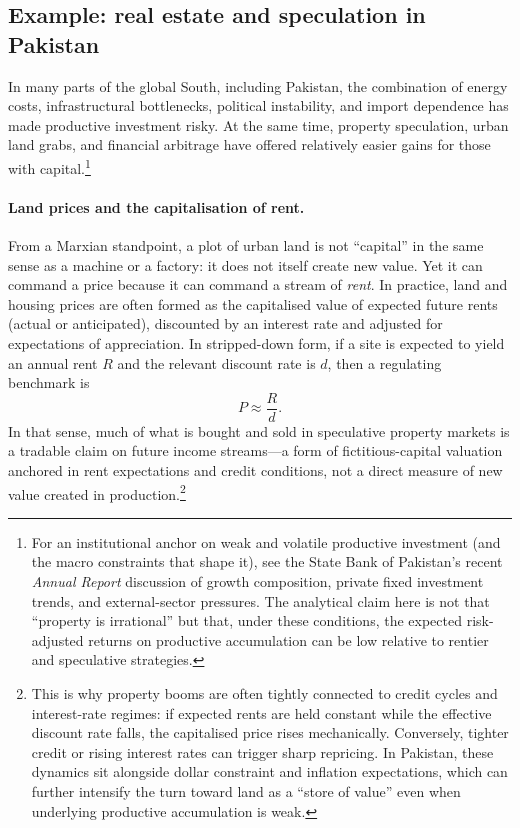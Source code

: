 \subsection{Example: real estate and speculation in Pakistan}
\label{sec:pk-real-estate-speculation}

In many parts of the global South, including Pakistan, the combination of
energy costs, infrastructural bottlenecks, political instability, and import
dependence has made productive investment risky. At the same time, property
speculation, urban land grabs, and financial arbitrage have offered
relatively easier gains for those with capital.\cite{StrugglePK_TDR}\footnote{For an institutional anchor on weak and volatile productive investment (and the macro constraints that shape it), see the State Bank of Pakistan's recent \emph{Annual Report} discussion of growth composition, private fixed investment trends, and external-sector pressures.\cite{SBPAnnualReportFY24} The analytical claim here is not that ``property is irrational'' but that, under these conditions, the expected risk-adjusted returns on productive accumulation can be low relative to rentier and speculative strategies.}

\paragraph{Land prices and the capitalisation of rent.}
From a Marxian standpoint, a plot of urban land is not ``capital'' in the same sense as a machine or a factory:
it does not itself create new value. Yet it can command a price because it can command a stream of
\emph{rent}. In practice, land and housing prices are often formed as the capitalised value of expected future
rents (actual or anticipated), discounted by an interest rate and adjusted for expectations of appreciation.
In stripped-down form, if a site is expected to yield an annual rent $R$ and the relevant discount rate is $d$,
then a regulating benchmark is
\[
  P \approx \frac{R}{d}.
\]
In that sense, much of what is bought and sold in speculative property markets is a tradable claim on future
income streams---a form of fictitious-capital valuation anchored in rent expectations and credit conditions,
not a direct measure of new value created in production.\footnote{This is why property booms are often tightly connected to credit cycles and interest-rate regimes: if expected rents are held constant while the effective discount rate falls, the capitalised price rises mechanically. Conversely, tighter credit or rising interest rates can trigger sharp repricing. In Pakistan, these dynamics sit alongside dollar constraint and inflation expectations, which can further intensify the turn toward land as a ``store of value'' even when underlying productive accumulation is weak.}

